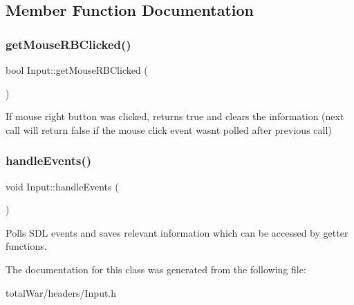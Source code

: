 \subsection{Member Function Documentation}
\mbox{\label{class_input_a024c8cc30eeebab4bc3c81618e96b82b}} 
\subsubsection{\texorpdfstring{get\+Mouse\+R\+B\+Clicked()}{getMouseRBClicked()}}
{\footnotesize\ttfamily bool Input\+::get\+Mouse\+R\+B\+Clicked (\begin{DoxyParamCaption}{ }\end{DoxyParamCaption})}

If mouse right button was clicked, returns true and clears the information (next call will return false if the mouse click event wasn\textquotesingle{}t polled after previous call) \mbox{\label{class_input_a562550a18665e9eaee2a808c95999741}} 
\subsubsection{\texorpdfstring{handle\+Events()}{handleEvents()}}
{\footnotesize\ttfamily void Input\+::handle\+Events (\begin{DoxyParamCaption}{ }\end{DoxyParamCaption})}

Polls S\+DL events and saves relevant information which can be accessed by getter functions. 

The documentation for this class was generated from the following file\+:\begin{DoxyCompactItemize}
\item 
total\+War/headers/Input.\+h\end{DoxyCompactItemize}
